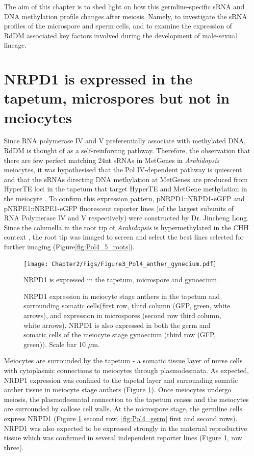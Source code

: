 The aim of this chapter is to shed light on how this germline-specific sRNA and DNA methylation profile changes after meiosis. Namely, to investigate the sRNA profiles of the microspore and sperm cells, and to examine the expression of RdDM associated key factors involved during the development of male-sexual lineage.
\clearpage

\section{NRPD1 is expressed in the tapetum, microspores but not in meiocytes}

Since RNA polymerase IV and V preferentially associate with methylated DNA, RdDM is thought of as a self-reinforcing pathway. Therefore, the observation that there are few perfect matching 24nt sRNAs in MetGenes in \textit{Arabidopsis} meiocytes, it was hypothesised that the Pol IV-dependent pathway is quiescent and that the sRNAs directing DNA methylation at MetGenes are produced from HyperTE loci in the tapetum that target HyperTE and MetGene methylation in the meiocyte \cite{RN199,RN187}. To confirm this expression pattern, pNRPD1::NRPD1-eGFP and pNRPE1::NRPE1-eGFP fluorescent reporter lines (of the largest subunits of RNA Polymerase IV and V respectively\cite{RN33}) were constructed by Dr. Jincheng Long. Since the columella in the root tip of \textit{Arabidopsis} is hypermethylated in the CHH context \cite{RN261}, the root tip was imaged to screen and select the best lines selected for further imaging (Figure\ref{fig:Pol4_5_roots}).

\begin{figure}[htbp!] 
\centering    
    \texttt{[image: Chapter2/Figs/Figure3\_Pol4\_anther\_gynecium.pdf]}
\caption{NRPD1 is expressed in the tapetum, microspore and gynoecium.}
\label{fig:Pol4_anther}
\captionsetup{font=small}
    \caption*{NRPD1 expression in meiocyte stage anthers in the tapetum and surrounding somatic cells(first row, third column (GFP, green, white arrows), and expression in microspores (second row third column, white arrows). NRPD1 is also expressed in both the germ and somatic cells of the meiocyte stage gynoecium (third row (GFP, green)). Scale bar 10 $\mu$m.}
\end{figure}

Meiocytes are surrounded by the tapetum - a somatic tissue layer of nurse cells with cytoplasmic connections to meiocytes through plasmodesmata. As expected, NRDP1 expression was confined to the tapetal layer and surrounding somatic anther tissue in meiocyte stage anthers (Figure \ref{fig:Pol4_anther}). Once meiocytes undergo meiosis, the plasmodesmatal connection to the tapetum ceases and the meiocytes are surrounded by callose cell walls. At the microspore stage, the germline cells express NRPD1 (Figure \ref{fig:Pol4_anther} second row, \ref{fig:Pol4_germ} first and second rows). NRPD1 was also expected to be expressed strongly in the maternal reproductive tissue \cite{RN165} which was confirmed in several independent reporter lines (Figure \ref{fig:Pol4_anther}, row three).

